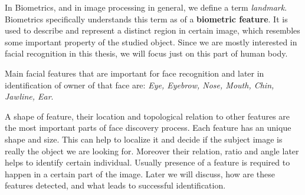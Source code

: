 In Biometrics, and in image processing in general, we define a term \textit{landmark}. Biometrics specifically understands this term as of a \textbf{biometric feature}. It is used to describe and represent a distinct region in certain image, which resembles some important property of the studied object. Since we are mostly interested in facial recognition in this thesis, we will focus just on this part of human body.

Main facial features that are important for face recognition and later in identification of owner of that face are: \textit{Eye, Eyebrow, Nose, Mouth, Chin, Jawline, Ear}.

A shape of feature, their location and topological relation to other features are the most important parts of face discovery process. Each feature has an unique shape and size. This can help to localize it and decide if the subject image is really the object we are looking for.  Moreover their relation, ratio and angle later helps to identify certain individual. Usually presence of a feature is required to happen in a certain part of the image. Later we will discuss, how are these features detected, and what leads to successful identification.
